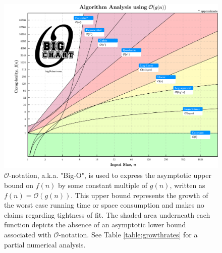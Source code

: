 \documentclass[10pt]{article}
\author{}
\title{\vspace{-2cm}} %
\date{\vspace{-1.5cm}}
\newcommand{\bigO}{\mathcal{O}}
\begin{document}
	
\maketitle

\begin{figure}[h!]
\begin{flushright}
	\begin{minipage}{6.5in}
		\includegraphics[width=468pt]{bigochart_6.5x5.png}
		\caption[]{$\bigO$-notation, a.k.a. "Big-O", is used to express the asymptotic upper bound on $f(n)$ by some constant multiple of $g(n)$, written as $f(n) = \bigO(g(n))$. This upper bound represents the growth of the worst case running time or space consumption and makes no claims regarding tightness of fit. The shaded area underneath each function depicts the absence of an asymptotic lower bound associated with $\bigO$-notation. See Table \ref{table:growthrates} for a partial numerical analysis.}
		\label{fig:bigochart}
	\end{minipage}
\end{flushright}
\end{figure}
\end{document}
